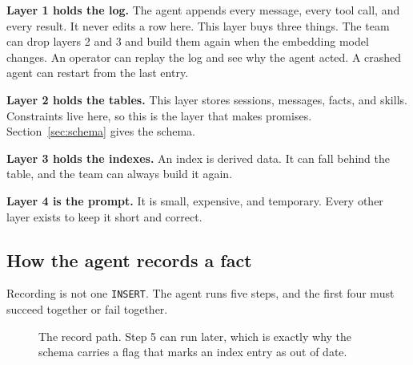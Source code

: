 \documentclass[11pt,a4paper]{article}
\newcommand{\code}[1]{\texttt{\small #1}}
\begin{document}
\textbf{Layer 1 holds the log.} The agent appends every message, every
tool call, and every result. It never edits a row here. This layer buys
three things. The team can drop layers 2 and 3 and build them again when
the embedding model changes. An operator can replay the log and see why
the agent acted. A crashed agent can restart from the last entry.

\textbf{Layer 2 holds the tables.} This layer stores sessions, messages,
facts, and skills. Constraints live here, so this is the layer that makes
promises. Section~\ref{sec:schema} gives the schema.

\textbf{Layer 3 holds the indexes.} An index is derived data. It can fall
behind the table, and the team can always build it again.

\textbf{Layer 4 is the prompt.} It is small, expensive, and temporary.
Every other layer exists to keep it short and correct.

\subsection{How the agent records a fact}

Recording is not one \code{INSERT}. The agent runs five steps, and the
first four must succeed together or fail together.

\begin{figure}[H]
\centering
{}
\caption[The record path]{The record path. Step 5 can run later, which is exactly why the
schema carries a flag that marks an index entry as out of date.}
\label{fig:record}
\end{figure}
\end{document}
